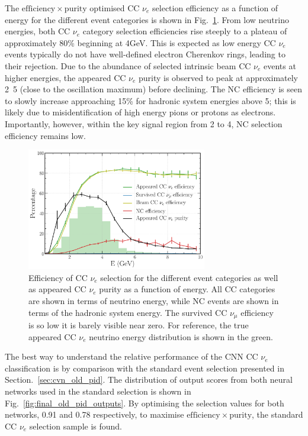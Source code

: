 The $\mathrm{efficiency}\times\mathrm{purity}$ optimised CC $\nu_{e}$ selection efficiency as a
function of energy for the different event categories is shown in Fig.~\ref{fig:final_nuel_hists}.
From low neutrino energies, both CC $\nu_{e}$ category selection efficiencies rise steeply to a
plateau of approximately 80\% beginning at \unit{4}{GeV}. This is expected as low energy CC
$\nu_{e}$ events typically do not have well-defined electron Cherenkov rings, leading to their
rejection. Due to the abundance of selected intrinsic beam CC $\nu_{e}$ events at higher energies,
the appeared CC $\nu_{e}$ purity is observed to peak at approximately \unit{2.5}{\GeV} (close to
the oscillation maximum) before declining. The NC efficiency is seen to slowly increase
approaching 15\% for hadronic system energies above \unit{5}{\GeV}; this is likely due to
misidentification of high energy pions or protons as electrons. Importantly, however, within the
key signal region from 2 to \unit{4}{\GeV}, NC selection efficiency remains low.

\begin{figure} %
    \includegraphics[width=0.7\textwidth]{diagrams/6-cvn/chipsnet/final_nuel_hists.pdf}
    \caption[Efficiency of CC $\nu_{e}$ selection as a function of energy.]
    {Efficiency of CC $\nu_{e}$ selection for the different event categories as well as appeared
        CC $\nu_{e}$ purity as a function of energy. All CC categories are shown in terms of
        neutrino energy, while NC events are shown in terms of the hadronic system energy. The
        survived CC $\nu_{\mu}$ efficiency is so low it is barely visible near zero. For
        reference, the true appeared CC $\nu_{e}$ neutrino energy distribution is shown in the
        green.}
    \label{fig:final_nuel_hists}
\end{figure}

The best way to understand the relative performance of the CNN CC $\nu_{e}$ classification is by
comparison with the standard event selection presented in Section.~\ref{sec:cvn_old_pid}. The
distribution of output scores from both neural networks used in the standard selection is shown in
Fig.~\ref{fig:final_old_pid_outputs}. By optimising the selection values for both networks, 0.91
and 0.78 respectively, to maximise $\mathrm{efficiency}\times\mathrm{purity}$, the standard CC
$\nu_{e}$ selection sample is found.

